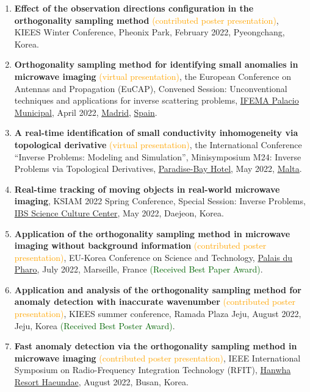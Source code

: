 \documentclass[10pt,A4]{article}
\begin{document}
\begin{enumerate}
\item\label{P-KIEES2022B} \textbf{Effect of the observation directions configuration in the orthogonality sampling method} \textcolor{orange}{(contributed poster presentation)}, KIEES Winter Conference, Pheonix Park, February 2022, Pyeongchang, Korea.
\item\label{P-EUCAP2022} \textbf{Orthogonality sampling method for identifying small anomalies in microwave imaging} \textcolor{orange}{(virtual presentation)}, the  European Conference on Antennas and Propagation (EuCAP), Convened Session: Unconventional techniques and applications for inverse scattering problems, \href{https://www.ifema.es/en}{IFEMA Palacio Municipal}, April 2022, \href{https://www.esmadrid.com/en}{Madrid}, \href{https://www.spain.info}{Spain}.
\item\label{P-IPMS2022} \textbf{A real-time identification of small conductivity inhomogeneity via topological derivative} \textcolor{orange}{(virtual presentation)}, the  International Conference ``Inverse Problems: Modeling and Simulation'', Minisymposium M24: Inverse Problems via Topological Derivatives, \href{https://www.paradise-bay.com/en}{Paradise-Bay Hotel}, May 2022, \href{https://www.visitmalta.com/en/island-of-malta}{Malta}.
\item\label{P-KSIAM2022} \textbf{Real-time tracking of moving objects in real-world microwave imaging}, KSIAM 2022 Spring Conference, Special Session: Inverse Problems, \href{https://www.ibs.re.kr/scc/main.do}{IBS Science Culture Center}, May 2022, Daejeon, Korea.
\item\label{P-EKC2022} \textbf{Application of the orthogonality sampling method in microwave imaging without background information} \textcolor{orange}{(contributed poster presentation)}, EU-Korea Conference on Science and Technology, \href{https://palaisdupharo.marseille.fr}{Palais du Pharo}, July 2022, Marseille, France \textcolor{darkgreen}{(Received Best Paper Award)}.
\item\label{P-KIEES2022C} \textbf{Application and analysis of the orthogonality sampling method for anomaly detection with inaccurate wavenumber} \textcolor{orange}{(contributed poster presentation)}, KIEES summer conference,  Ramada Plaza Jeju, August 2022, Jeju, Korea \textcolor{darkgreen}{(Received Best Poster Award)}.
\item\label{P-RFIT2022} \textbf{Fast anomaly detection via the orthogonality sampling method in microwave imaging} \textcolor{orange}{(contributed poster presentation)}, IEEE International Symposium on Radio-Frequency Integration Technology (RFIT), \href{https://hanwha-resort-haeundae.busan-hotel.com/en/}{Hanwha Resort Haeundae}, August 2022, Busan, Korea.

\end{enumerate}
\end{document}
